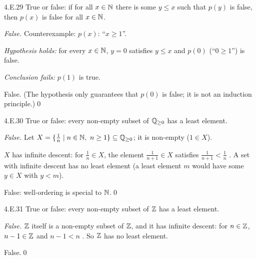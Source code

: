 \begin{bookex}[essential]{4.E.29}
True or false: if for all $x\in\mathbb{N}$ there is some $y\le x$ such that $p(y)$ is false, then $p(x)$ is false for all $x\in\mathbb{N}$.
\solution
\begin{steps}
\item \emph{False.} Counterexample: $p(x)$: ``$x\ge1$''.
\item \emph{Hypothesis holds:} for every $x\in\mathbb{N}$, $y=0$ satisfies $y\le x$ and $p(0)$ (``$0\ge1$'') is false.
\item \emph{Conclusion fails:} $p(1)$ is true.
\end{steps}
\conclusion False. (The hypothesis only guarantees that $p(0)$ is false; it is not an induction principle.)\qed
\end{bookex}

\begin{bookex}[essential]{4.E.30}
True or false: every non-empty subset of $\mathbb{Q}_{\ge0}$ has a least element.
\solution
\begin{steps}
\item \emph{False.} Let $X=\{\frac1n\mid n\in\mathbb{N},\ n\ge1\}\subseteq\mathbb{Q}_{\ge0}$; it is non-empty ($1\in X$).
\item $X$ has infinite descent: for $\frac1n\in X$, the element $\frac1{n+1}\in X$ satisfies $\frac1{n+1}<\frac1n$ . A set with infinite descent has no least element (a least element $m$ would have some $y\in X$ with $y<m$).
\end{steps}
\conclusion False: well-ordering is special to $\mathbb{N}$.\qed
\end{bookex}

\begin{bookex}[essential]{4.E.31}
True or false: every non-empty subset of $\mathbb{Z}$ has a least element.
\solution
\begin{steps}
\item \emph{False.} $\mathbb{Z}$ itself is a non-empty subset of $\mathbb{Z}$, and it has infinite descent: for $n\in\mathbb{Z}$, $n-1\in\mathbb{Z}$ and $n-1<n$ . So $\mathbb{Z}$ has no least element.
\end{steps}
\conclusion False.\qed
\end{bookex}

